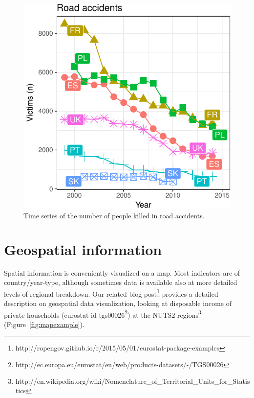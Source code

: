 \begin{figure}
\begin{center}
\includegraphics{2015-manu-roadacc-1}
\end{center}
\caption{Time series of the number of people killed in road accidents.}
\label{fig:roadaccidents}
\end{figure}





\section{Geospatial information}

Spatial information is conveniently visualized on a map. Most
indicators are of country/year-type, although sometimes data is
available also at more detailed levels of regional breakdown. Our
related blog
post\footnote{http://ropengov.github.io/r/2015/05/01/eurostat-package-examples}
provides a detailed description on geospatial data visualization,
looking at disposable income of private households (eurostat id
tgs00026\footnote{http://ec.europa.eu/eurostat/en/web/products-datasets/-/TGS00026})
at the NUTS2
regions\footnote{http://en.wikipedia.org/wiki/Nomenclature\_of\_Territorial\_Units\_for\_Statistics}
(Figure~\ref{fig:mapexample}).

